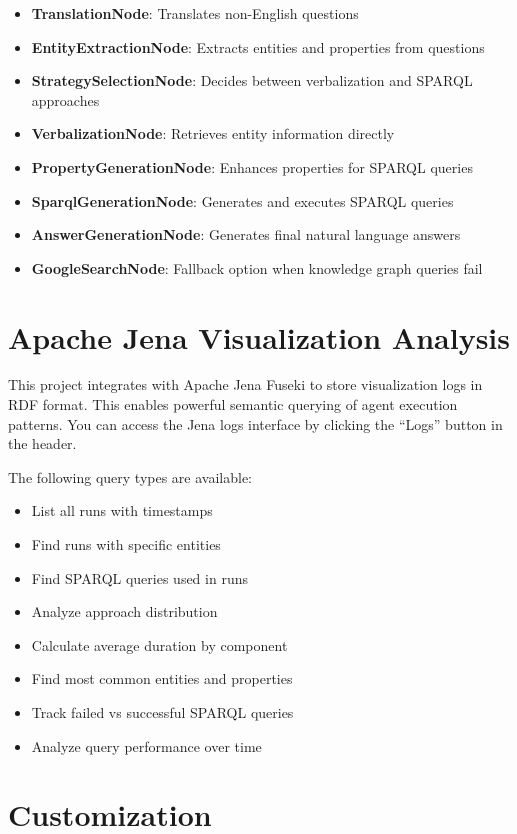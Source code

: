 \begin{itemize}
    \item \textbf{TranslationNode}: Translates non-English questions
    \item \textbf{EntityExtractionNode}: Extracts entities and properties from questions
    \item \textbf{StrategySelectionNode}: Decides between verbalization and SPARQL approaches
    \item \textbf{VerbalizationNode}: Retrieves entity information directly
    \item \textbf{PropertyGenerationNode}: Enhances properties for SPARQL queries
    \item \textbf{SparqlGenerationNode}: Generates and executes SPARQL queries
    \item \textbf{AnswerGenerationNode}: Generates final natural language answers
    \item \textbf{GoogleSearchNode}: Fallback option when knowledge graph queries fail
\end{itemize}

\section*{Apache Jena Visualization Analysis}

This project integrates with Apache Jena Fuseki to store visualization logs in RDF format. This enables powerful semantic querying of agent execution patterns. You can access the Jena logs interface by clicking the ``Logs'' button in the header.

The following query types are available:
\begin{itemize}
    \item List all runs with timestamps
    \item Find runs with specific entities
    \item Find SPARQL queries used in runs
    \item Analyze approach distribution
    \item Calculate average duration by component
    \item Find most common entities and properties
    \item Track failed vs successful SPARQL queries
    \item Analyze query performance over time
\end{itemize}

\section*{Customization}


